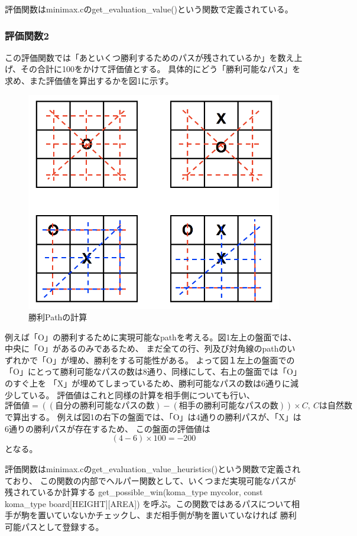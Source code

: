 \documentclass[uplatex]{jsarticle}
\begin{document}
評価関数はminimax.cのget\_evaluation\_value()という関数で定義されている。
\subsubsection{評価関数2}
この評価関数では「あといくつ勝利するためのパスが残されているか」を数え上げ、その合計に100をかけて評価値とする。
具体的にどう「勝利可能なパス」を求め、また評価値を算出するかを図1に示す。
\begin{figure}
  \begin{center}
    \includegraphics[width=13cm]{img/eval_2.png}
    \caption{勝利Pathの計算}
  \end{center}
\end{figure}
例えば「O」の勝利するために実現可能なpathを考える。図1左上の盤面では、中央に「O」があるのみであるため、
まだ全ての行、列及び対角線のpathのいずれかで「O」が埋め、勝利をする可能性がある。
よって図１左上の盤面での「O」にとって勝利可能なパスの数は8通り、同様にして、右上の盤面では「O」のすぐ上を
「X」が埋めてしまっているため、勝利可能なパスの数は6通りに減少している。
評価値はこれと同様の計算を相手側についても行い、
$$評価値 = ((自分の勝利可能なパスの数) - (相手の勝利可能なパスの数)) \times C,\ Cは自然数 $$
で算出する。
例えば図1の右下の盤面では、「O」は4通りの勝利パスが、「X」は6通りの勝利パスが存在するため、
この盤面の評価値は
$$(4 - 6) \times 100 = -200$$となる。

評価関数はminimax.cのget\_evaluation\_value\_heuristics()という関数で定義されており、
この関数の内部でヘルパー関数として、いくつまだ実現可能なパスが残されているか計算する
get\_possible\_win(koma\_type mycolor, const koma\_type board[HEIGHT][AREA])
を呼ぶ。この関数ではあるパスについて相手が駒を置いていないかチェックし、まだ相手側が駒を置いていなければ
勝利可能パスとして登録する。
\end{document}
